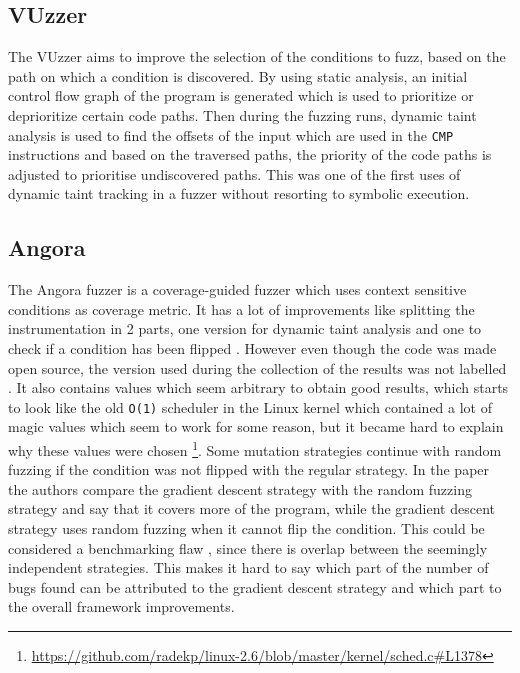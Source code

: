 \subsection{VUzzer}
The VUzzer \cite{rawat2017vuzzer} aims to improve the selection of the conditions to fuzz, based on the path on which a condition is discovered. By using static analysis, an initial control flow graph of the program is generated which is used to prioritize or deprioritize certain code paths. Then during the fuzzing runs, dynamic taint analysis is used to find the offsets of the input which are used in the \texttt{CMP} instructions and based on the traversed paths, the priority of the code paths is adjusted to prioritise undiscovered paths. This was one of the first uses of dynamic taint tracking in a fuzzer without resorting to symbolic execution. 

\subsection{Angora}\label{subsec:angora}
The Angora fuzzer is a coverage-guided fuzzer which uses context sensitive conditions as coverage metric. It has a lot of improvements like splitting the instrumentation in 2 parts, one version for dynamic taint analysis and one to check if a condition has been flipped \cite{chen2018angora}. However even though the code was made open source, the version used during the collection of the results was not labelled \cite{angora2020blogpost}. It also contains values which seem arbitrary to obtain good results, which starts to look like the old \texttt{O(1)} scheduler in the Linux kernel which contained a lot of magic values which seem to work for some reason, but it became hard to explain why these values were chosen \footnote{\url{https://github.com/radekp/linux-2.6/blob/master/kernel/sched.c\#L1378}}. Some mutation strategies continue with random fuzzing if the condition was not flipped with the regular strategy. In the paper the authors compare the gradient descent strategy with the random fuzzing strategy and say that it covers more of the program, while the gradient descent strategy uses random fuzzing when it cannot flip the condition. This could be considered a benchmarking flaw \cite{van2018benchmarking}, since there is overlap between the seemingly independent strategies. This makes it hard to say which part of the number of bugs found can be attributed to the gradient descent strategy and which part to the overall framework improvements.

